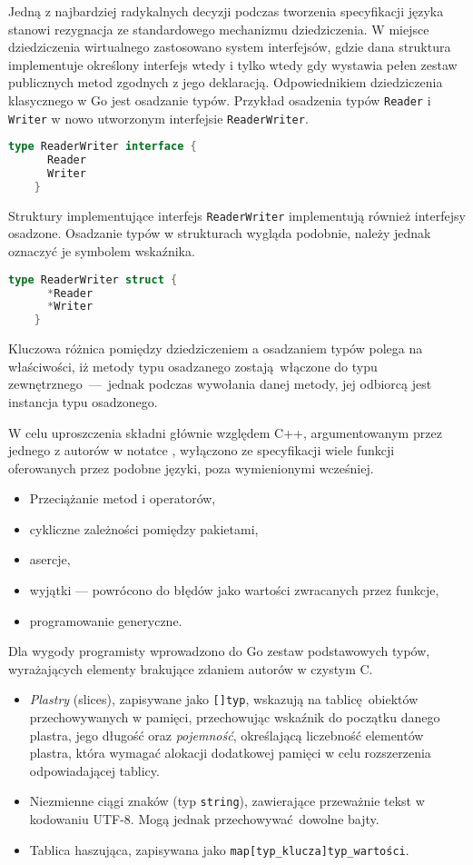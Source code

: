   \par{
  Jedną z najbardziej radykalnych decyzji podczas tworzenia specyfikacji języka stanowi rezygnacja ze standardowego mechanizmu dziedziczenia. W miejsce dziedziczenia wirtualnego zastosowano system interfejsów, gdzie dana struktura implementuje określony interfejs wtedy i tylko wtedy gdy wystawia pełen zestaw publicznych metod zgodnych z jego deklaracją. Odpowiednikiem dziedziczenia klasycznego w Go jest osadzanie typów.
  Przykład osadzenia typów \texttt{Reader} i \texttt{Writer} w nowo utworzonym interfejsie \texttt{ReaderWriter}.
  \begin{lstlisting}[language=go]
    type ReaderWriter interface {
      Reader
      Writer
    }
  \end{lstlisting}
  Struktury implementujące interfejs \texttt{ReaderWriter} implementują również interfejsy osadzone.
  Osadzanie typów w strukturach wygląda podobnie, należy jednak oznaczyć je symbolem wskaźnika.
  \begin{lstlisting}[language=go]
    type ReaderWriter struct {
      *Reader
      *Writer
    }
  \end{lstlisting}
  Kluczowa różnica pomiędzy dziedziczeniem a osadzaniem typów polega na właściwości, iż metody typu osadzanego zostają włączone do typu zewnętrznego~---~jednak podczas wywołania danej metody, jej odbiorcą jest instancja typu osadzonego. \cite{godoc:embedding}
}
\par {
W celu uproszczenia składni głównie względem C++, argumentowanym przez jednego z autorów w notatce \cite{Pike:LessIsMore}, wyłączono ze specyfikacji wiele funkcji oferowanych przez podobne języki, poza wymienionymi wcześniej.
  \begin{itemize}
    \item Przeciążanie metod i operatorów,
    \item cykliczne zależności pomiędzy pakietami,
    \item asercje,
    \item wyjątki --- powrócono do błędów jako wartości zwracanych przez funkcje,
    \item programowanie generyczne.
  \end{itemize}
}
\par{
  Dla wygody programisty wprowadzono do Go zestaw podstawowych typów, wyrażających elementy brakujące zdaniem autorów w czystym C.
  \begin{itemize}
    \item \emph{Plastry} (slices), zapisywane jako \texttt{[]typ}, wskazują na tablicę obiektów przechowywanych w pamięci, przechowując wskaźnik do początku danego plastra, jego długość oraz \emph{pojemność}, określającą liczebność elementów plastra, która wymagać alokacji dodatkowej pamięci w celu rozszerzenia odpowiadającej tablicy.
    \item Niezmienne ciągi znaków (typ \texttt{string}), zawierające przeważnie tekst w kodowaniu UTF-8. Mogą jednak przechowywać dowolne bajty.
    \item Tablica haszująca, zapisywana jako \texttt{map[typ\_klucza]typ\_wartości}.
  \end{itemize}
}
